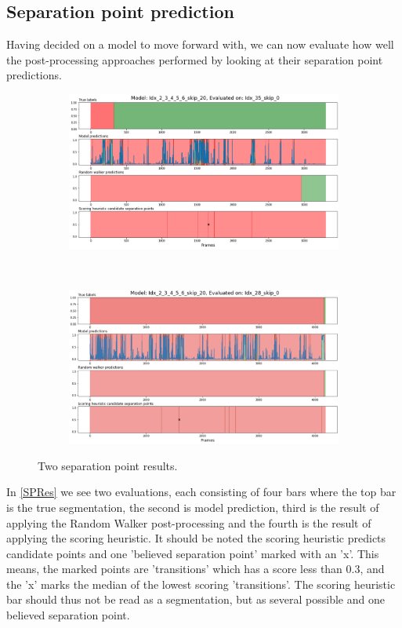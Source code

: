 \subsection{Separation point prediction}
Having decided on a model to move forward with, we can now evaluate how well the post-processing approaches performed by looking at their separation point predictions.

\begin{figure}[H]
	\centering
	\begin{subfigure}{\linewidth}
		\centering
		\includegraphics[width=\linewidth]{Materials/Results/SP/M4On35}
	\end{subfigure}
	\\
	\begin{subfigure}{\linewidth}
		\centering
		\includegraphics[width=\linewidth]{Materials/Results/SP/M4On28}
	\end{subfigure}
	\caption{Two separation point results.}
	\label{SPRes}
\end{figure}
In \autoref{SPRes} we see two evaluations, each consisting of four bars where the top bar is the true segmentation, the second is model prediction, third is the result of applying the Random Walker post-processing and the fourth is the result of applying the scoring heuristic. It should be noted the scoring heuristic predicts candidate points and one 'believed separation point' marked with an 'x'. This means, the marked points are 'transitions' which has a score less than $0.3$, and the 'x' marks the median of the lowest scoring 'transitions'. The scoring heuristic bar should thus not be read as a segmentation, but as several possible and one believed separation point.

